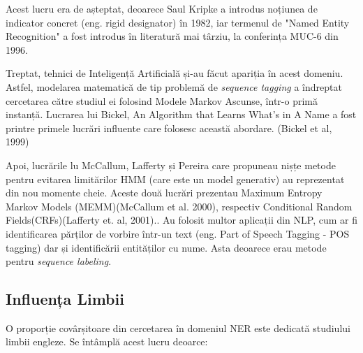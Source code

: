 Acest lucru era de așteptat, deoarece Saul Kripke a introdus noțiunea de indicator concret (eng. rigid designator) în 1982, iar termenul de "Named Entity Recognition" a fost introdus în literatură mai târziu, la conferința MUC-6 din 1996.\cite{grishman1996}


Treptat, tehnici de Inteligență Artificială și-au făcut apariția în acest domeniu. Astfel, modelarea matematică de tip problemă de \textit{sequence tagging} a îndreptat cercetarea către studiul ei folosind Modele Markov Ascunse, într-o primă instanță. Lucrarea lui Bickel, An Algorithm that Learns What's in A Name a fost printre primele lucrări influente care folosesc această abordare. (Bickel et al, 1999)\cite{Bikel99analgorithm}

Apoi, lucrările lu McCallum, Lafferty și Pereira care propuneau nișțe metode pentru evitarea limitărilor HMM (care este un model generativ) au reprezentat din nou momente cheie. Aceste două lucrări prezentau Maximum Entropy Markov Models (MEMM)(McCallum et al. 2000)\cite{Mccallum00maximumentropy}, respectiv Conditional Random Fields(CRFs)(Lafferty et. al, 2001).\cite{Lafferty01conditionalrandom}. Au folosit multor aplicații din NLP, cum ar fi identificarea părților de vorbire într-un text (eng. Part of Speech Tagging - POS tagging) dar și identificării entităților cu nume. Asta deoarece erau metode pentru \textit{sequence labeling}.


\subsection{Influența Limbii}

O proporție covârșitoare din cercetarea în domeniul NER este dedicată studiului limbii engleze. Se întâmplă acest lucru deoarce:

